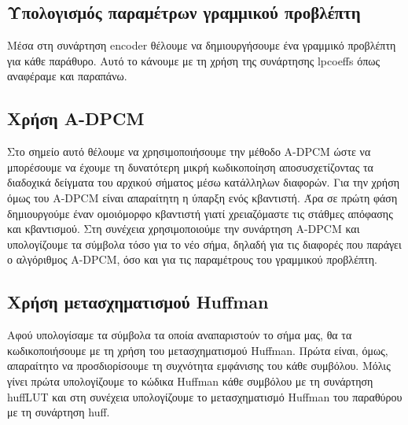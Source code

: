 \subsection{Υπολογισμός παραμέτρων γραμμικού προβλέπτη}
\par Μέσα στη συνάρτηση encoder θέλουμε να δημιουργήσουμε ένα γραμμικό προβλέπτη για
κάθε παράθυρο. Αυτό το κάνουμε με τη χρήση της συνάρτησης lpcoeffs όπως αναφέραμε και
παραπάνω.

\subsection{Χρήση A-DPCM}
\par Στο σημείο αυτό θέλουμε να χρησιμοποιήσουμε την μέθοδο A-DPCM ώστε να μπορέσουμε
να έχουμε τη δυνατότερη μικρή κωδικοποίηση αποσυσχετίζοντας τα διαδοχικά δείγματα του αρχικού
σήματος μέσω κατάλληλων διαφορών. Για την χρήση όμως του A-DPCM είναι
απαραίτητη η ύπαρξη ενός κβαντιστή. Άρα σε πρώτη φάση δημιουργούμε έναν ομοιόμορφο
κβαντιστή γιατί χρειαζόμαστε τις στάθμες απόφασης και κβαντισμού. Στη συνέχεια
χρησιμοποιούμε την συνάρτηση A-DPCM και υπολογίζουμε τα σύμβολα τόσο για το νέο σήμα, δηλαδή για τις
διαφορές που παράγει ο αλγόριθμος A-DPCM,
όσο και για τις παραμέτρους του γραμμικού προβλέπτη.

\subsection{Χρήση μετασχηματισμού Huffman}

\par Αφού υπολογίσαμε τα σύμβολα τα οποία αναπαριστούν το σήμα μας, θα τα
κωδικοποιήσουμε με τη χρήση του μετασχηματισμού Huffman. Πρώτα είναι, όμως,
απαραίτητο να προσδιορίσουμε τη συχνότητα εμφάνισης του κάθε συμβόλου. Μόλις
γίνει πρώτα υπολογίζουμε το κώδικα Huffman κάθε συμβόλου με τη συνάρτηση huffLUT
και στη συνέχεια υπολογίζουμε το μετασχηματισμό Huffman του παραθύρου με τη συνάρτηση
huff.

